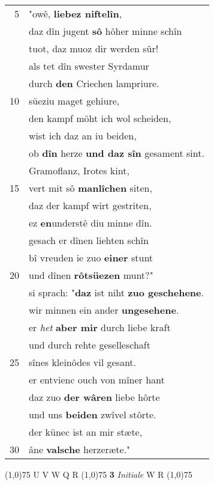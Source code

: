 \documentclass[8pt,a4paper,notitlepage]{article}
\begin{document}
\begin{table}[ht]
\begin{minipage}[t]{0.5\linewidth}
\begin{tabular}{rl}
5 & "owê, \textbf{liebez niftelîn},\\ 
 & daz dîn jugent \textbf{sô} hôher minne schîn\\ 
 & tuot, daz muoz dir werden sûr!\\ 
 & als tet dîn swester Syrdamur\\ 
 & durch \textbf{den} Criechen lampriure.\\ 
10 & süeziu maget gehiure,\\ 
 & den kampf möht ich wol scheiden,\\ 
 & wist ich daz an iu beiden,\\ 
 & ob \textbf{dîn} herze \textbf{und daz sîn} gesament sint.\\ 
 & Gramoflanz, Irotes kint,\\ 
15 & vert mit sô \textbf{manlîchen} siten,\\ 
 & daz der kampf wirt gestriten,\\ 
 & ez \textbf{en}understê diu minne dîn.\\ 
 & gesach er dînen liehten schîn\\ 
 & bî vreuden ie zuo \textbf{einer} stunt\\ 
20 & und dînen \textbf{rôtsüezen} munt?"\\ 
 & si sprach: "\textbf{daz} ist niht \textbf{zuo geschehene}.\\ 
 & wir minnen ein ander \textbf{ungesehene}.\\ 
 & er \textit{het} \textbf{aber mir} durch liebe kraft\\ 
 & und durch rehte geselleschaft\\ 
25 & sînes kleinôdes vil gesant.\\ 
 & er entvienc ouch von mîner hant\\ 
 & daz zuo \textbf{der wâren} liebe hôrte\\ 
 & und uns \textbf{beiden} zwîvel stôrte.\\ 
 & der künec ist an mir stæte,\\ 
30 & âne \textbf{valsche} herzeræte."\\ 
\end{tabular}
\scriptsize
\line(1,0){75} \newline
U V W Q R \newline
\line(1,0){75} \newline
\textbf{3} \textit{Initiale} W R  \newline
\line(1,0){75} \newline

\end{minipage}
\end{table}
\end{document}
